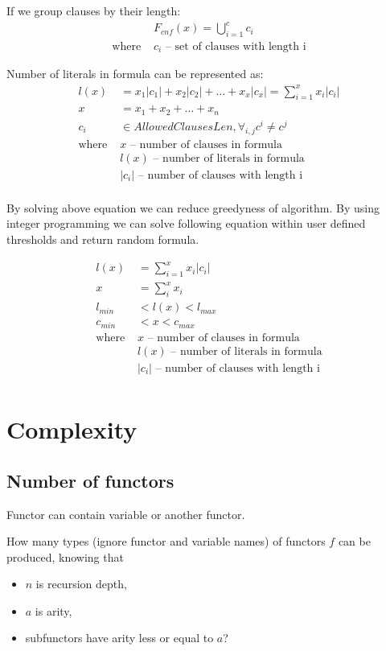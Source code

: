 If we group clauses by their length:
\begin{align*}
	&F_{cnf}(x) = \bigcup_{i=1}^c c_i \\
	\text{where }
		&c_i \text{ -- set of clauses with length i}
\end{align*}

Number of literals in formula can be represented as:
\begin{align*}
	l(x) &= x_1|c_1| + x_2|c_2| + \dots + x_x|c_x| = \sum_{i=1}^{x} x_i |c_i| \\
	x &= x_1 + x_2 + \dots + x_n \\
	c_i &\in AllowedClausesLen, \forall_{i,j} c^i \neq c^j  \\
	\text{where }
		&x \text{ -- number of clauses in formula} \\
		&l(x) \text{ -- number of literals in formula} \\
		&|c_i| \text{ -- number of clauses with length i} \\
\end{align*}

By solving above equation we can reduce greedyness of algorithm. By using integer programming we can solve following equation within user defined thresholds and return random formula.

\begin{align*}
	l(x) &= \sum_{i=1}^{x} x_i |c_i| \\
	x &= \sum_i^x x_i \\
	l_{min} &< l(x) < l_{max} \\
	c_{min} &< x < c_{max} \\
	\text{where }
		&x \text{ -- number of clauses in formula} \\
		&l(x) \text{ -- number of literals in formula} \\
		&|c_i| \text{ -- number of clauses with length i} \\
\end{align*}

\section{Complexity}

\subsection{Number of functors}

Functor can contain variable or another functor.

How many types (ignore functor and variable names) of functors $f$ can be produced, knowing that
\begin{itemize}
	\item $n$ is recursion depth,
	\item $a$ is arity,
	\item subfunctors have arity less or equal to $a$?
\end{itemize}


